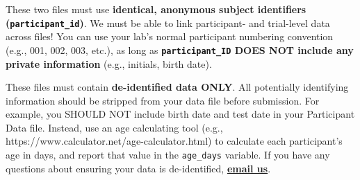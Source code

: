 \documentclass[
  letterpaper,
  DIV=11,
  numbers=noendperiod,
  oneside]{scrreprt}
\begin{document}
\begin{tcolorbox}[enhanced jigsaw, coltitle=black, colframe=quarto-callout-caution-color-frame, titlerule=0mm, colback=white, arc=.35mm, toprule=.15mm, left=2mm, colbacktitle=quarto-callout-caution-color!10!white, opacityback=0, bottomtitle=1mm, title=\textcolor{quarto-callout-caution-color}{\faFire}\hspace{0.5em}{IMPORTANT NOTE \#1}, breakable, rightrule=.15mm, opacitybacktitle=0.6, toptitle=1mm, leftrule=.75mm, bottomrule=.15mm]

These two files must use \textbf{identical, anonymous subject
identifiers (\texttt{participant\_id})}. We must be able to link
participant- and trial-level data across files! You can use your lab's
normal participant numbering convention (e.g., 001, 002, 003, etc.), as
long as \textbf{\texttt{participant\_ID} DOES NOT include any private
information} (e.g., initials, birth date).

\end{tcolorbox}

\begin{tcolorbox}[enhanced jigsaw, coltitle=black, colframe=quarto-callout-caution-color-frame, titlerule=0mm, colback=white, arc=.35mm, toprule=.15mm, left=2mm, colbacktitle=quarto-callout-caution-color!10!white, opacityback=0, bottomtitle=1mm, title=\textcolor{quarto-callout-caution-color}{\faFire}\hspace{0.5em}{IMPORTANT NOTE \#2}, breakable, rightrule=.15mm, opacitybacktitle=0.6, toptitle=1mm, leftrule=.75mm, bottomrule=.15mm]

These files must contain \textbf{de-identified data ONLY}. All
potentially identifying information should be stripped from your data
file before submission. For example, you SHOULD NOT include birth date
and test date in your Participant Data file. Instead, use an age
calculating tool (e.g., https://www.calculator.net/age-calculator.html)
to calculate each participant's age in days, and report that value in
the \texttt{age\_days} variable. If you have any questions about
ensuring your data is de-identified,
\href{mailto:mb5@manybabies.org}{\textbf{email us}}.

\end{tcolorbox}
\end{document}
